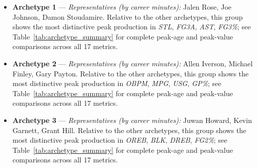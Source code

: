 \begin{itemize}
\item \textbf{Archetype 1} --- \emph{Representatives (by career minutes):} Jalen Rose, Joe Johnson, Damon Stoudamire. Relative to the other archetypes, this group shows the most distinctive peak production in \textit{STL}, \textit{FG3A}, \textit{AST}, \textit{FG3\%}; see Table~\ref{tab:archetype_summary} for complete peak-age and peak-value comparisons across all 17 metrics.
\item \textbf{Archetype 2} --- \emph{Representatives (by career minutes):} Allen Iverson, Michael Finley, Gary Payton. Relative to the other archetypes, this group shows the most distinctive peak production in \textit{OBPM}, \textit{MPG}, \textit{USG}, \textit{GP\%}; see Table~\ref{tab:archetype_summary} for complete peak-age and peak-value comparisons across all 17 metrics.
\item \textbf{Archetype 3} --- \emph{Representatives (by career minutes):} Juwan Howard, Kevin Garnett, Grant Hill. Relative to the other archetypes, this group shows the most distinctive peak production in \textit{OREB}, \textit{BLK}, \textit{DREB}, \textit{FG2\%}; see Table~\ref{tab:archetype_summary} for complete peak-age and peak-value comparisons across all 17 metrics.
\end{itemize}
